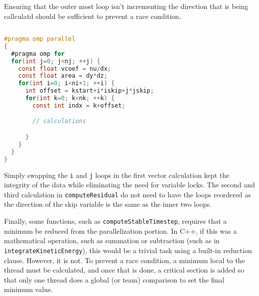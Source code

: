 \documentclass{article}
\begin{document}
  Ensuring that the outer most loop isn't incrementing the direction that is
  being callculatd should be sufficient to prevent a race condition.

  \begin{lstfloat}
  \begin{lstlisting}[language=C, 
                     linewidth=1\textwidth,
                     breaklines=true, 
                     basicstyle=\small\ttfamily]
                     
#pragma omp parallel
{
  #pragma omp for
  for(int j=0; j<nj; ++j) {
    const float vcoef = nu/dx;
    const float area = dy*dz;
    for(int i=0; i<ni+1; ++i) {
      int offset = kstart+i*iskip+j*jskip;
      for(int k=0; k<nk; ++k) {
        const int indx = k+offset;

        // calculations

      }
    }
  }
}

  \end{lstlisting}
  \end{lstfloat}

  Simply swapping the \verb|i| and \verb|j| loops in the first vector
  calculation kept the integrity of the data while eliminating the need for
  variable locks. The second and third calculation in \verb|computeResidual| do
  not need to have the loops reordered as the direction of the skip variable is
  the same as the inner two loops.

  Finally, some functions, such as \verb|computeStableTimestep|, requires that
  a minimum be reduced from the parallelization portion. In C++, if this was a
  mathematical operation, such as summation or subtraction (such as in
  \verb|integrateKineticEnergy|), this would be a trivial task using a built-in
  reduction clause. However, it is not. To prevent a race condition, a minimum
  local to the thread must be calculated, and once that is done, a critical
  section is added so that only one thread does a global (or team) comparison
  to set the final minimum value.
\end{document}
